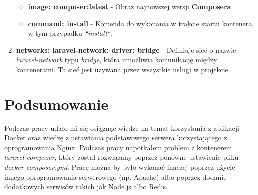 \documentclass{article}
\begin{document}
\begin{enumerate}
    \begin{itemize}
        \item \textbf{image: composer:latest} - Obraz najnowszej wersji \textbf{Composera}.
        \item \textbf{command: install} - Komenda do wykonania w trakcie startu kontenera, w tym przypadku \textit{``install``}.
    \end{itemize}
    \item \textbf{networks: laravel-network: driver: bridge} - Definiuje sieć o nazwie \textit{laravel-network} typu \textit{bridge}, która umożliwia komunikację między kontenerami. Ta sieć jest używana przez wszystkie usługi w projekcie.
\end{enumerate}

\section{Podsumowanie}
Podczas pracy udało mi się osiągnąć wiedzę na temat korzystania z aplikacji Docker oraz wiedzę z ustawiania podstawowego serwera korzystającego z oprogramowania Nginx. Podczas pracy napotkałem problem z kontenerem \textit{laravel-composer}, który został rozwiązany poprzez ponowne ustawienie pliku \textit{docker-composer.yml}. Pracę można by było wykonać inaczej poprzez użycie innego oprogramowania serwerowego (np. Apache) albo poprzez dodanie dodatkowych serwisów takich jak Node.js albo Redis.
\end{document}
